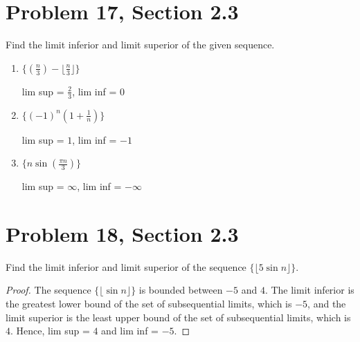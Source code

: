 \documentclass[12pt]{article}
\begin{document}
  \newpage



  \section*{Problem 17, Section 2.3}
  Find the limit inferior and limit superior of the given sequence.
  \begin{enumerate}[label=(\alph*)]
    \item $\{(\frac{n}{3}) - \lfloor\frac{n}{3}\rfloor\}$
    
    lim sup = $\frac{2}{3}$, lim inf = $0$    
    \item $\{(-1)^n(1 + \frac{1}{n})\}$
    
    lim sup = $1$, lim inf = $-1$
    \item $\{n \sin(\frac{\pi n}{3})\}$

    lim sup = $\infty$, lim inf = $-\infty$
  \end{enumerate}  
  \newpage

\section*{Problem 18, Section 2.3}
Find the limit inferior and limit superior of the sequence $\{\lfloor 5\sin n\rfloor\}$.

\begin{proof}
  The sequence $\{\lfloor \sin n\rfloor\}$ is bounded between $-5$ and $4$. The limit inferior is the greatest lower bound of the set of subsequential limits, which is $-5$, and the limit superior is the least upper bound of the set of subsequential limits, which is $4$. Hence, lim sup = $4$ and lim inf = $-5$.
\end{proof}
  
\end{document}

